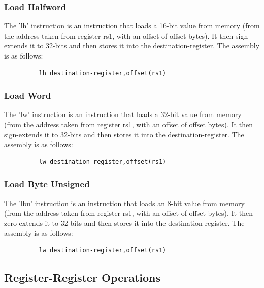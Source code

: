 \subsubsection{Load Halfword}
\qquad
The 'lh' instruction is an instruction that loads a 16-bit value from memory (from the address taken from register rs1, with an offset of offset bytes). It then sign-extends it to 32-bits and then stores it into the destination-register. The assembly is as follows:
\begin{figure}[!htbp]
    \centering
    \begin{verbatim}
    lh destination-register,offset(rs1)
    \end{verbatim}
\end{figure}\newline

\subsubsection{Load Word}
\qquad
The 'lw' instruction is an instruction that loads a 32-bit value from memory (from the address taken from register rs1, with an offset of offset bytes). It then sign-extends it to 32-bits and then stores it into the destination-register. The assembly is as follows:
\begin{figure}[!htbp]
    \centering
    \begin{verbatim}
    lw destination-register,offset(rs1)
    \end{verbatim}
\end{figure}\newline

\subsubsection{Load Byte Unsigned}
\qquad
The 'lbu' instruction is an instruction that loads an 8-bit value from memory (from the address taken from register rs1, with an offset of offset bytes). It then zero-extends it to 32-bits and then stores it into the destination-register. The assembly is as follows:
\begin{figure}[!htbp]
    \centering
    \begin{verbatim}
    lw destination-register,offset(rs1)
    \end{verbatim}
\end{figure}\newline


\subsection{Register-Register Operations}

